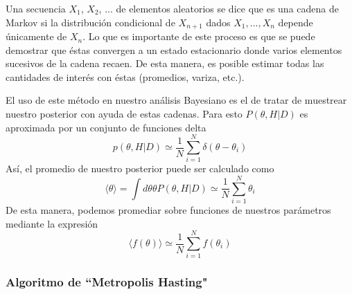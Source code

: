 \documentclass[onecolumn,           %
               showpacs,            %
               preprintnumbers,     %
               aps,                 %
               prl,          	    %
               letterpaper,             %
               superscriptaddress,      %
               nofootinbib,         %
               tightenlines,        %
               floats,floatfix      %
               ,usenatbib,
               ]{revtex4-1}
\begin{document}
Una secuencia $X_1$, $X_2$, ... de elementos aleatorios se dice que es una cadena de Markov si la distribuci\'on condicional de $X_{n+1}$ dados $X_1,...,X_n$ depende \'unicamente de $X_n$. Lo que es importante de este proceso es que se puede demostrar que \'estas convergen a un estado estacionario donde varios elementos sucesivos de la cadena recaen. De esta manera, es posible estimar todas las cantidades de inter\'es con \'estas (promedios, variza, etc.). 

El uso de este m\'etodo en nuestro an\'alisis Bayesiano es el de tratar de muestrear nuestro posterior con ayuda de estas cadenas. Para esto $P(\theta,H|D)$ es aproximada por un conjunto de funciones delta
\begin{equation}
p(\theta,H|D)\simeq \frac{1}{N}\sum_{i=1}^N \delta(\theta-\theta_i)
\end{equation}
As\'i, el promedio de nuestro posterior puede ser calculado como 
\begin{equation}
\langle\theta\rangle=\int d\theta \theta P(\theta,H|D)\simeq \frac{1}{N}\sum_{i=1}^N\theta_i
\end{equation}
De esta manera, podemos promediar sobre funciones de nuestros par\'ametros mediante la expresi\'on 
\begin{equation}
\langle f(\theta)\rangle \simeq\frac{1}{N}\sum_{i=1}^N f(\theta_i)
\end{equation}
\subsubsection{Algoritmo de ``Metropolis Hasting"}
\end{document}
